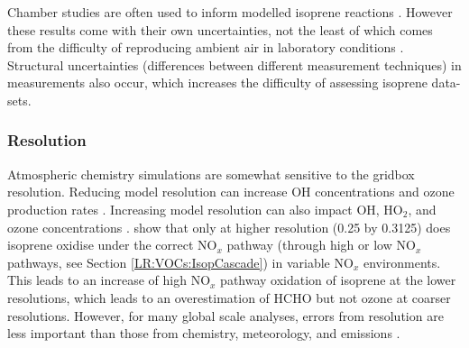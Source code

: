       
      
      Chamber studies are often used to inform modelled isoprene reactions 
      \parencite[e.g.,][]{Paulot2009b}.
      However these results come with their own uncertainties, not the least of 
      which comes from the difficulty of reproducing ambient air in laboratory 
      conditions \parencite{Nguyen2014}.
      Structural uncertainties (differences between different measurement 
      techniques) in measurements also occur, which increases the difficulty of 
      assessing isoprene data-sets.
      
    \subsubsection{Resolution}
      \label{LR:Models:Uncert:Resolution}
      
      Atmospheric chemistry simulations are somewhat sensitive to the gridbox resolution.
      Reducing model resolution can increase OH concentrations and ozone production rates \parencite{Wild2006}.
      Increasing model resolution can also impact OH, HO$_2$, and ozone 
      concentrations \parencite[e.g.,][]{Christian2017}.
      \textcite{Yu2016} show that only at higher resolution (0.25 by 0.3125\degr) does isoprene oxidise under the correct NO$_x$ pathway (through high or low NO$_x$ pathways, see Section \ref{LR:VOCs:IsopCascade}) in variable NO$_x$ environments.
      This leads to an increase of high NO$_x$ pathway oxidation of isoprene at the lower resolutions, which leads to an overestimation of HCHO but not ozone at coarser resolutions.
      However, for many global scale analyses, errors from resolution are less important than those from chemistry, meteorology, and emissions \parencite{Christian2017, Christian2018}.
      
